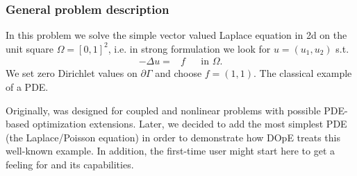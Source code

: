 \subsubsection{General problem description}
In this problem we solve the simple vector valued Laplace equation in 2d
on the unit square $\Omega=[0,1]^2$, i.e. in strong formulation we look for $u=(u_1,u_2)$ s.t.
\begin{align*}
-\Delta u =& f &&\text{in }\Omega.
\end{align*}
We set zero Dirichlet values on $\partial \Gamma$ and choose $f=(1,1)$. The
classical example of a PDE.

\begin{remark}
Originally, \dope{} was designed for coupled and nonlinear problems
with possible PDE-based optimization extensions. Later, we decided 
to add the most simplest PDE (the Laplace/Poisson equation) 
in order to demonstrate how DOpE treats
this well-known example. In addition, the first-time user might 
start here to get a feeling for \dope{} and its capabilities.
\end{remark}

